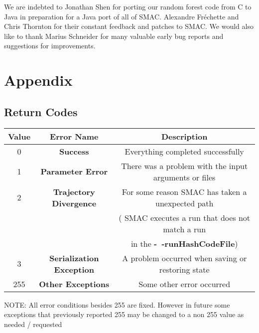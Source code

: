 \documentclass[11pt,letterpaper,oneside]{article}
\begin{document}
We are indebted to Jonathan Shen for porting our random forest code from C to Java in preparation for a Java port of all of SMAC. Alexandre Fr\'echette and Chris Thornton for their constant feedback and patches to SMAC.  We would also like to thank Marius Schneider for many valuable early bug reports and suggestions for improvements. 



\renewcommand{\bibsection}{\section{References}}




\section{Appendix}
\subsection{Return Codes}

\begin{table}[h]
\begin{tabular}{| c | c | c |}
\hline
Value & Error Name & Description \\
\hline
\hline
0 & \textbf{Success} & Everything completed successfully \\
\hline
1 & \textbf{Parameter Error} & There was a problem with the input arguments or files  \\
\hline
2 & \textbf{Trajectory Divergence} & For some reason SMAC has taken a unexpected path \\

& & (\eg{} SMAC executes a run that does not match a run \\
& & in the \textbf{-~$\!\!$-runHashCodeFile}) \\
\hline
3 & \textbf{Serialization Exception} & A problem occurred when saving or restoring state \\
\hline
255 & \textbf{Other Exceptions} & Some other error occurred \\
\hline
\end{tabular}
\end{table}

\textsc{NOTE:} All error conditions besides 255 are fixed. However in future some exceptions that previously reported 255 may be changed to a non 255 value as needed / requested
\\
\\
\\
\\
\\
\\
\end{document}
